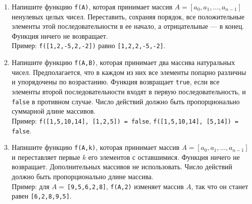 \documentclass{article}
\begin{document}
\begin{enumerate}[label={}, leftmargin=0pt, itemindent=0pt]
\begin{enumerate}[label=\arabic{enumi}.\arabic*.]
\item 
Напишите функцию \texttt{f(A)}, которая принимает массив $A = [a_0, a_1, \ldots, a_{n-1}]$ ненулевых целых чисел. Переставить, сохраняя порядок, все положительные элементы этой последовательности в ее начало, а отрицательные --- в конец. Функция ничего не возвращает. 
\\Пример: \texttt{f([1,2,-5,2,-2])} равно \texttt{[1,2,2,-5,-2]}.

\item 
Напишите функцию \texttt{f(A,B)}, которая принимает два массива натуральных чисел. Предполагается, что в каждом из них все элементы попарно различны и упорядочены по возрастанию. Функция возвращает \texttt{true}, если все элементы второй последовательности входят в первую последовательность, и \texttt{false} в противном случае. Число действий должно быть пропорционально суммарной длине массивов.
\\Пример: \texttt{f([1,5,10,14], [1,2,5]) = false}, \newline \texttt{f([1,5,10,14], [5,14]) = false}.

\item 
Напишите функцию \texttt{f(A,k)}, которая принимает массив $A = [a_0, a_1, \ldots, a_{n-1}]$ и переставляет первые $k$ его элементов с оставшимися. Функция ничего не возвращает. Дополнительных массивов не использовать. Число действий должно быть пропорционально длине массива.
\\Пример: для $A=$\,\texttt{[9,5,6,2,8]}, \texttt{f(A,2)} изменяет массив $A$, так что он станет равен \texttt{[6,2,8,9,5]}.
\end{enumerate}

\end{enumerate}
\end{document}
